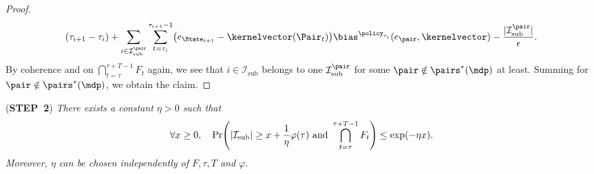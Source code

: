 \documentclass[preprint,cleveref,12pt]{colt2025}
\DeclarePairedDelimiter{\parens}{(}{)}	%
\DeclarePairedDelimiter{\abs}{\lvert}{\rvert}	%
\def\model{\mdp}
\def\kernel{\kernelvector}
\def\STEP#1{(\strong{STEP~#1})}
\newcommand{\strong}[1]{\textbf{#1}}
\begin{document}
\begin{proof}
\begin{equation}
            (\tau_{i+1} - \tau_i)
            +
            \sum_{i \in \mathcal{I}_\mathrm{sub}^\pair} 
            \sum_{t=\tau_i}^{\tau_{i+1}-1}
            \parens*{
                e_{\State_{t+1}} - \kernel(\Pair_t)
            } \bias^{\policy_{\tau_i}}(e_\pair, \kernel)
            - \frac {\abs{\mathcal{I}_\mathrm{sub}^\pair}}\epsilon
            .
        \end{equation}
        By coherence and on $\bigcap_{t=\tau}^{\tau+T-1} F_t$ again, we see that $i \in \mathcal{I}_\mathrm{sub}$ belongs to one $\mathcal{I}_\mathrm{sub}^\pair$ for some $\pair \notin \pairs^*(\model)$ at least. 
        Summing for $\pair \notin \pairs^*(\model)$, we obtain the claim.
    \end{proof}

    \noindent
    \STEP{2}
    \textit{
        There exists a constant $\eta > 0$ such that
        \begin{equation}
        \label{equation_coherence_suboptimal_2}
            \forall x \ge 0,
            \quad
            \Pr \parens*{
                \abs*{\mathcal{I}_\mathrm{sub}} \ge x + \frac 1\eta \varphi(\tau)
                \text{~and~} \bigcap_{t=\tau}^{\tau+T-1} F_t
            }
            \le 
            \exp \parens*{- \eta x}.
        \end{equation}
        Moreover, $\eta$ can be chosen independently of $F, \tau, T$ and $\varphi$.
    }
    \medskip
\end{document}
